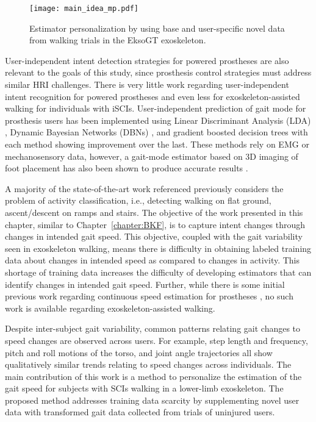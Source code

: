 \begin{figure}
	\centering
	\texttt{[image: main\_idea\_mp.pdf]}
	\caption{Estimator personalization by using base and user-specific novel data from walking trials in the EksoGT exoskeleton.}\label{fig:main_idea_mp}
\end{figure}

User-independent intent detection strategies for powered prostheses are also relevant to the goals of this study, since prosthesis control strategies must address similar HRI challenges. There is very little work regarding user-independent intent recognition for powered prostheses and even less for exoskeleton-assisted walking for individuals with iSCIs. User-independent prediction of gait mode for prosthesis users has been implemented using Linear Discriminant Analysis (LDA) \cite{young2013classifying}, Dynamic Bayesian Networks (DBNs) \cite{young2015classification}, and gradient boosted decision trees \cite{bhakta2020machine} with each method showing improvement over the last. These methods rely on EMG or mechanosensory data, however, a gait-mode estimator based on 3D imaging of foot placement has also been shown to produce accurate results \cite{massalin2017user}. 

A majority of the state-of-the-art work referenced previously considers the problem of activity classification, i.e., detecting walking on flat ground, ascent/descent on ramps and stairs. The objective of the work presented in this chapter, similar to Chapter~\ref{chapter:BKF}, is to capture intent changes through changes in intended gait speed. This objective, coupled with the gait variability seen in exoskeleton walking, means there is difficulty in obtaining labeled training data about changes in intended speed as compared to changes in activity. This shortage of training data increases the difficulty of developing estimators that can identify changes in intended gait speed. Further, while there is some initial previous work regarding continuous speed estimation for prostheses \cite{best2021phase}, no such work is available regarding exoskeleton-assisted walking.

Despite inter-subject gait variability, common patterns relating gait changes to speed changes are observed across users. For example, step length and frequency, pitch and roll motions of the torso, and joint angle trajectories all show qualitatively similar trends relating to speed changes across individuals. The main contribution of this work is a method to personalize the estimation of the gait speed for subjects with SCIs walking in a lower-limb exoskeleton. The proposed method addresses training data scarcity by supplementing novel user data with transformed gait data collected from trials of uninjured users. 

